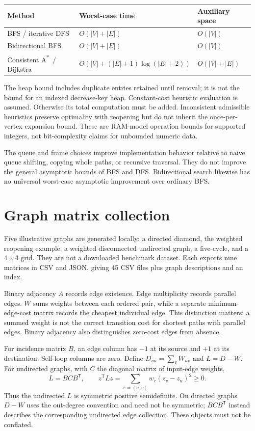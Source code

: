 \documentclass[11pt,a4paper]{article}
\newcommand{\astar}{A\textsuperscript{*}}
\begin{document}
\begin{center}
\small
\begin{tabular}{@{}lll@{}}
\toprule
Method & Worst-case time & Auxiliary space\\
\midrule
BFS / iterative DFS & $O(|V|+|E|)$ & $O(|V|)$\\
Bidirectional BFS & $O(|V|+|E|)$ & $O(|V|)$\\
Consistent \astar\ / Dijkstra & $O(|V|+(|E|+1)\log(|E|+2))$ & $O(|V|+|E|)$\\
\bottomrule
\end{tabular}
\end{center}
The heap bound includes duplicate entries retained until removal; it is not the bound for an indexed decrease-key heap. Constant-cost heuristic evaluation is assumed. Otherwise its total computation must be added. Inconsistent admissible heuristics preserve optimality with reopening but do not inherit the once-per-vertex expansion bound. These are RAM-model operation bounds for supported integers, not bit-complexity claims for unbounded numeric data.

The queue and frame choices improve implementation behavior relative to naive queue shifting, copying whole paths, or recursive traversal. They do not improve the general asymptotic bounds of BFS and DFS. Bidirectional search likewise has no universal worst-case asymptotic improvement over ordinary BFS.

\section{Graph matrix collection}
Five illustrative graphs are generated locally: a directed diamond, the weighted reopening example, a weighted disconnected undirected graph, a five-cycle, and a $4\times4$ grid. They are not a downloaded benchmark dataset. Each exports nine matrices in CSV and JSON, giving 45 CSV files plus graph descriptions and an index.

Binary adjacency $A$ records edge existence. Edge multiplicity records parallel edges. $W$ sums weights between each ordered pair, while a separate minimum-edge-cost matrix records the cheapest individual edge. This distinction matters: a summed weight is not the correct transition cost for shortest paths with parallel edges. Binary adjacency also distinguishes zero-cost edges from absence.

For incidence matrix $B$, an edge column has $-1$ at its source and $+1$ at its destination. Self-loop columns are zero. Define $D_{uu}=\sum_v W_{uv}$ and $L=D-W$. For undirected graphs, with $C$ the diagonal matrix of input-edge weights,
\begin{equation}
 L=BCB^{\mathsf T},\qquad
 z^{\mathsf T}Lz=\sum_{e=(u,v)}w_e(z_v-z_u)^2\geq0.
\end{equation}
Thus the undirected $L$ is symmetric positive semidefinite. On directed graphs $D-W$ uses the out-degree convention and need not be symmetric; $BCB^{\mathsf T}$ instead describes the corresponding undirected edge collection. These objects must not be conflated.
\end{document}
